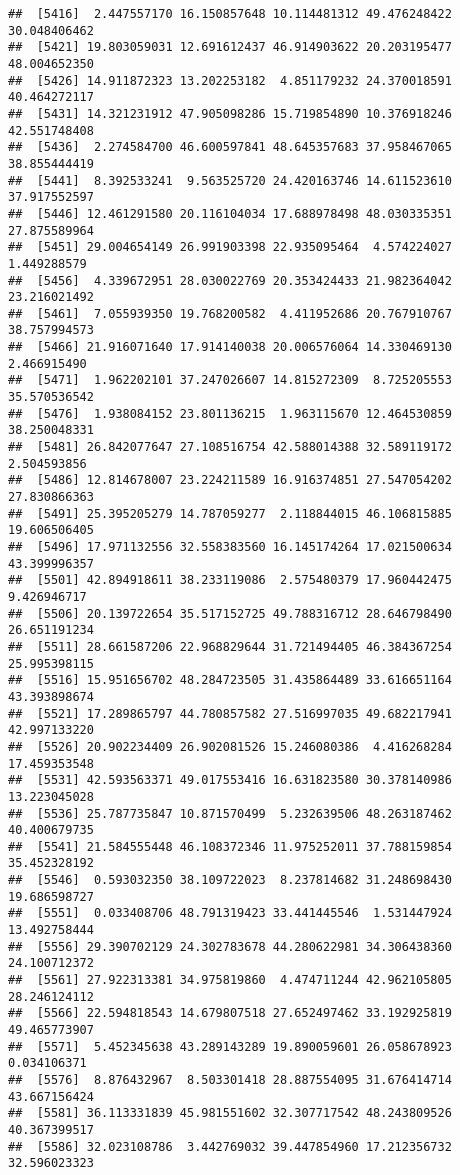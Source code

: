 \documentclass[
]{article}
\begin{document}
\begin{verbatim}
##  [5416]  2.447557170 16.150857648 10.114481312 49.476248422 30.048406462
##  [5421] 19.803059031 12.691612437 46.914903622 20.203195477 48.004652350
##  [5426] 14.911872323 13.202253182  4.851179232 24.370018591 40.464272117
##  [5431] 14.321231912 47.905098286 15.719854890 10.376918246 42.551748408
##  [5436]  2.274584700 46.600597841 48.645357683 37.958467065 38.855444419
##  [5441]  8.392533241  9.563525720 24.420163746 14.611523610 37.917552597
##  [5446] 12.461291580 20.116104034 17.688978498 48.030335351 27.875589964
##  [5451] 29.004654149 26.991903398 22.935095464  4.574224027  1.449288579
##  [5456]  4.339672951 28.030022769 20.353424433 21.982364042 23.216021492
##  [5461]  7.055939350 19.768200582  4.411952686 20.767910767 38.757994573
##  [5466] 21.916071640 17.914140038 20.006576064 14.330469130  2.466915490
##  [5471]  1.962202101 37.247026607 14.815272309  8.725205553 35.570536542
##  [5476]  1.938084152 23.801136215  1.963115670 12.464530859 38.250048331
##  [5481] 26.842077647 27.108516754 42.588014388 32.589119172  2.504593856
##  [5486] 12.814678007 23.224211589 16.916374851 27.547054202 27.830866363
##  [5491] 25.395205279 14.787059277  2.118844015 46.106815885 19.606506405
##  [5496] 17.971132556 32.558383560 16.145174264 17.021500634 43.399996357
##  [5501] 42.894918611 38.233119086  2.575480379 17.960442475  9.426946717
##  [5506] 20.139722654 35.517152725 49.788316712 28.646798490 26.651191234
##  [5511] 28.661587206 22.968829644 31.721494405 46.384367254 25.995398115
##  [5516] 15.951656702 48.284723505 31.435864489 33.616651164 43.393898674
##  [5521] 17.289865797 44.780857582 27.516997035 49.682217941 42.997133220
##  [5526] 20.902234409 26.902081526 15.246080386  4.416268284 17.459353548
##  [5531] 42.593563371 49.017553416 16.631823580 30.378140986 13.223045028
##  [5536] 25.787735847 10.871570499  5.232639506 48.263187462 40.400679735
##  [5541] 21.584555448 46.108372346 11.975252011 37.788159854 35.452328192
##  [5546]  0.593032350 38.109722023  8.237814682 31.248698430 19.686598727
##  [5551]  0.033408706 48.791319423 33.441445546  1.531447924 13.492758444
##  [5556] 29.390702129 24.302783678 44.280622981 34.306438360 24.100712372
##  [5561] 27.922313381 34.975819860  4.474711244 42.962105805 28.246124112
##  [5566] 22.594818543 14.679807518 27.652497462 33.192925819 49.465773907
##  [5571]  5.452345638 43.289143289 19.890059601 26.058678923  0.034106371
##  [5576]  8.876432967  8.503301418 28.887554095 31.676414714 43.667156424
##  [5581] 36.113331839 45.981551602 32.307717542 48.243809526 40.367399517
##  [5586] 32.023108786  3.442769032 39.447854960 17.212356732 32.596023323

\end{verbatim}
\end{document}
